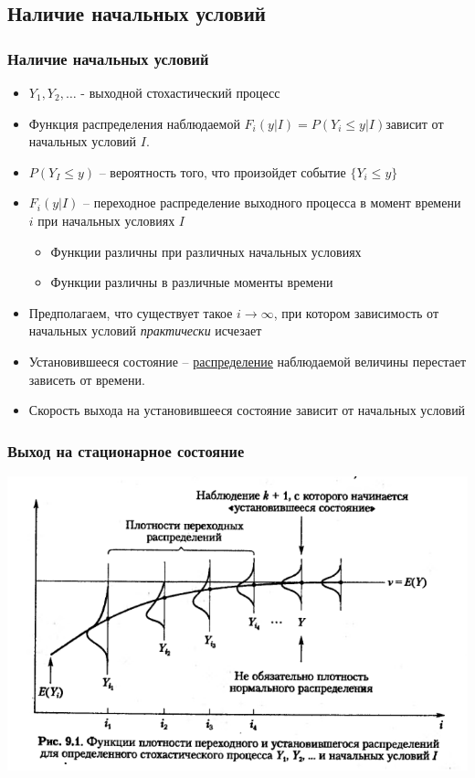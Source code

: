 \documentclass[utf8]{beamer}
\begin{document}
\subsection{Наличие начальных условий}
\begin{frame}
\frametitle{Наличие начальных условий}
\begin{itemize}
	\item $Y_1, Y_2, \ldots$ - выходной стохастический процесс
	\item Функция распределения наблюдаемой $F_i(y|I) = P(Y_i \leq y | I)$зависит от начальных условий $I$.
	\item $P(Y_I \leq y)$ -- вероятность того, что произойдет событие $\{Y_i \leq y\}$
	\item $F_i(y|I)$ -- переходное распределение выходного процесса в момент времени $i$ при начальных условиях $I$
		\begin{itemize}
			\item Функции различны при различных начальных условиях
			\item Функции различны в различные моменты времени
		\end{itemize}
	\item Предполагаем, что существует такое $i\rightarrow \infty$, при котором зависимость от начальных условий \emph{практически} исчезает
	\item  Установившееся состояние -- \underline{распределение} наблюдаемой величины перестает зависеть от времени.
	\item Скорость выхода на установившееся состояние зависит от начальных условий
\end{itemize}
\end{frame}
\begin{frame}
\frametitle {Выход на стационарное состояние}
\begin{center}
\includegraphics[width=\textwidth]{pic/9-2.png}
\end{center}
\end{frame}
\end{document}
